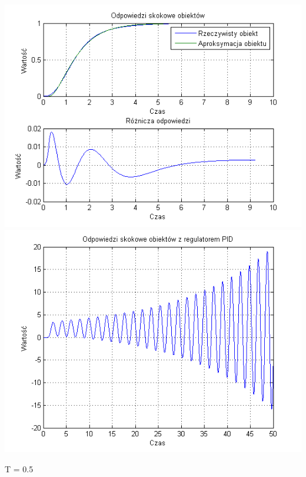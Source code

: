 \documentclass[10pt,a4paper]{article}
\begin{document}
\begin{center}
\includegraphics[scale=1]{images/dwa/skrypt_253.png}\\
\includegraphics[scale=1]{images/dwa/skrypt_254.png}\\
\end{center}
\newpage
T = 0.5
\end{document}
